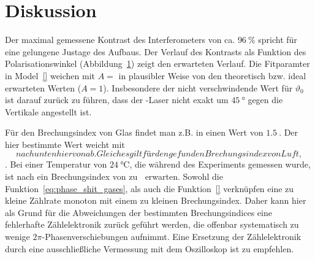 \newpage
\section{Diskussion}
Der maximal gemessene Kontrast des Interferometers von ca. $\SI{96}{\percent}$ spricht für 
eine gelungene Justage des Aufbaus. Der Verlauf des Kontrasts als Funktion des Polarisationswinkel 
(Abbildung~\ref{}) zeigt den erwarteten Verlauf. Die Fitparamter in Model~\eqref{} weichen mit 
$A = $ in plausibler Weise von den theoretisch bzw. ideal erwarteten Werten ($A = 1$). Insbesondere 
der nicht verschwindende Wert für $\vartheta_0$ ist darauf zurück zu führen, dass der -Laser 
nicht exakt um $\SI{45}{\degree}$ gegen die Vertikale angestellt ist.

Für den Brechungsindex von Glas findet man z.B. in \cite{} einen Wert von $\SI{1.5}{}$. Der hier bestimmte 
Wert weicht mit $$ nach unten hiervon ab. Gleiches gilt 
für den gefunden Brechungsindex von Luft, $$. Bei einer Temperatur von $\SI{24}{\celsius}$, die 
während des Experiments gemessen wurde, ist nach \cite{} ein Brechungsindex von zu $\SI{}{}$ erwarten. Sowohl die 
Funktion~\eqref{eq:phase_shit_gases}, als auch die Funktion~\eqref{} verknüpfen eine zu kleine Zählrate monoton mit einem zu kleinen 
Brechungsindex. Daher kann hier als Grund für die Abweichungen der bestimmten Brechungsindices eine 
fehlerhafte Zählelektronik zurück geführt werden, die offenbar systematisch zu wenige $2\pi$-Phasenverschiebungen aufnimmt. 
Eine Ersetzung der Zählelektronik durch eine ausschließliche Vermessung mit dem Oszilloskop ist zu empfehlen.
